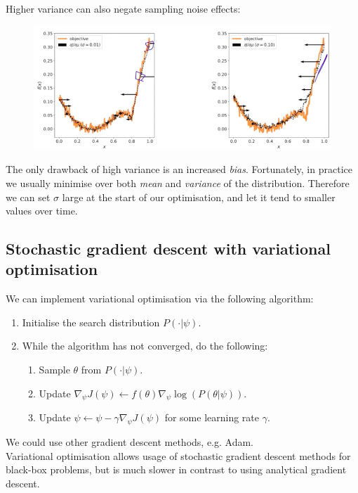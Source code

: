 Higher variance can also negate sampling noise effects:

\begin{figure}[H]
\centering
\includegraphics[scale=0.4]{variationalboundnoise.png}
\end{figure}

The only drawback of high variance is an increased \textit{bias}. Fortunately, in practice we usually minimise over both \textit{mean} and \textit{variance} of the distribution. Therefore we can set $\sigma$ large at the start of our optimisation, and let it tend to smaller values over time.




\newpage
\subsection{Stochastic gradient descent with variational optimisation}
We can implement variational optimisation via the following algorithm:
\begin{enumerate}
\item Initialise the search distribution $P(\cdot | \psi)$.
\item While the algorithm has not converged, do the following:
\begin{enumerate}[label = (\roman*)]
\item Sample $\theta$ from $P(\cdot | \psi)$.
\item Update $\nabla_{\psi} J(\psi) \leftarrow f(\theta) \nabla_{\psi} \log(P(\theta | \psi))$.
\item Update $\psi \leftarrow \psi - \gamma \nabla_{\psi} J(\psi)$ for some learning rate $\gamma$. 
\end{enumerate}
\end{enumerate}
 We could use other gradient descent methods, e.g. Adam.\\
 
 Variational optimisation allows usage of stochastic gradient descent methods for black-box problems, but is much slower in contrast to using analytical gradient descent.\\
 
